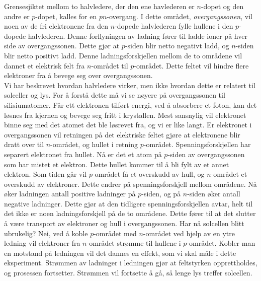 \documentclass[%
 reprint,
 amsmath,amssymb,
 aps,
 norsk,
 booktabs
]{revtex4-1}
\begin{document}
Grensesjiktet mellom to halvledere, der den ene havlederen er $n$-dopet og den andre er $p$-dopet, kalles for en $pn$-overgang. I dette området, \textit{overgangssonen}, vil noen av de fri elektronene fra den $n$-dopede halvlederen fylle hullene i den $p$-dopede halvlederen. Denne forflyningen av ladning fører til ladde ioner på hver side av overgangssonen. Dette gjør at $p$-siden blir netto negativt ladd, og $n$-siden blir netto positivt ladd. Denne ladningsforskjellen mellom de to områdene vil dannet et elektrisk felt fra $n$-området til $p$-området. Dette feltet vil hindre flere elektroner fra å bevege seg over overgangssonen.\\
Vi har beskrevet hvordan halvledere virker, men ikke hvordan dette er relatert til solceller og lys. For å  forstå dette må vi se nøyere på overgangssonen til silisiumatomer. Får ett elektronen tilført energi, ved å absorbere et foton, kan det løsnes fra kjernen og bevege seg fritt i krystallen. Mest sansnylig vil elektronet binne seg med det atomet det ble løsrevet fra, og vi er like langt. Er elektronet i overgangssonen vil retningen på det elektriske feltet gjøre at elektronene blir dratt over til $n$-området, og hullet i retning $p$-området. Spenningsforskjellen har separert elektronet fra hullet. Nå er det et atom på $p$-siden av overgangssonen som har mistet et elektron. Dette hullet kommer til å bli fylt av et annet elektron. Som tiden går vil $p$-området få et overskudd av hull, og $n$-området et overskudd av elektroner. Dette endrer på spenningsforskjell mellom områdene. Nå øker ladningen antall positive ladninger på $p$-siden, og på $n$-siden øker antall negative ladninger. Dette gjør at den tidligere spenningsforskjellen avtar, helt til det ikke er noen ladningsforskjell på de to områdene. Dette fører til at det slutter å være transport av elektroner og hull i overgangssonen. Har nå solcellen blitt ubrukelig? Nei, ved å koble $p$-området med $n$-området ved hjelp av en ytre ledning vil elektroner fra $n$-området strømme til hullene i $p$-området. Kobler man en motstand på ledningen vil det dannes en effekt, som vi skal måle i dette eksperiment. Strømmen av ladninger i ledningen gjør at feltstyrken opprettholdes, og prosessen fortsetter. Strømmen vil fortsette å gå, så lenge lys treffer solcellen.\par
\end{document}
